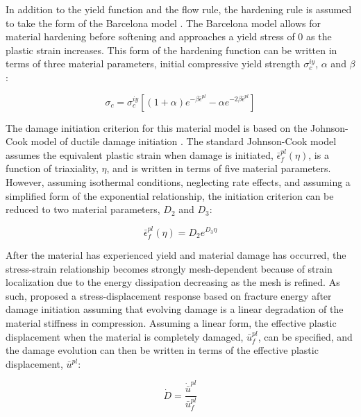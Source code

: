 In addition to the yield function and the flow rule, the hardening rule is assumed to take the form of the Barcelona model \citep{lubliner_plastic-damage_1989}. The Barcelona model allows for material hardening before softening and approaches a yield stress of 0 as the plastic strain increases.  This form of the hardening function can be written in terms of three material parameters, initial compressive yield strength $\sigma_c^{iy}$, $\alpha$ and $\beta$:

\begin{equation}
\sigma_c=\sigma_c^{iy}\left [ \left ( 1+\alpha \right ) e^{-\beta\bar{\epsilon}^{pl}}-\alpha e^{-2\beta\bar{\epsilon}^{pl}}  \right ]
\label{eqn:druc3}
\end{equation}

The damage initiation criterion for this material model is based on the Johnson-Cook model of ductile damage initiation \citep{Johnson_1985}. The standard Johnson-Cook model assumes the equivalent plastic strain when damage is initiated, $\bar{\epsilon}_{f}^{pl}\left(\eta\right)$, is a function of triaxiality, $\eta$, and is written in terms of five material parameters. However, assuming isothermal conditions, neglecting rate effects, and assuming a simplified form of the exponential relationship, the initiation criterion can be reduced to two material parameters, $D_2$ and $D_3$:

\begin{equation}
\bar{\epsilon}_{f}^{pl}\left(\eta\right)=D_{2}e^{D_{3}\eta}
\label{eqn:druc4}
\end{equation}

After the material has experienced yield and material damage has occurred, the stress-strain relationship becomes strongly mesh-dependent because of strain localization due to the energy dissipation decreasing as the mesh is refined. As such, \citet{Hillerborg_1976} proposed a stress-displacement response based on fracture energy after damage initiation assuming that evolving damage is a linear degradation of the material stiffness in compression. Assuming a linear form, the effective plastic displacement when the material is completely damaged, $\bar{u}^{pl}_f$, can be specified, and the damage evolution can then be written in terms of the effective plastic displacement, $\bar{u}^{pl}$:

\begin{equation}
\dot{D}=\frac{\dot{\bar{u}}^{pl}}{\bar{u}_{f}^{pl}}
\label{eqn:druc5}
\end{equation}

